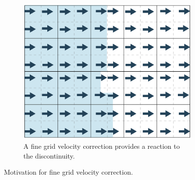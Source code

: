 \begin{figure}[htbp]
\begin{subfigure}{0.3\textwidth}
	\end{subfigure}
		\hfill
	\begin{subfigure}{0.3\textwidth}
		\centering
		\includegraphics[width=1.0\linewidth]{figs/fgvel3.png}
		\caption{A fine grid velocity correction provides a reaction to the discontinuity.}
		\label{fig:fgVel3}
	\end{subfigure}
	\caption{Motivation for fine grid velocity correction.}
	\label{fig:fgvel}
\end{figure}

